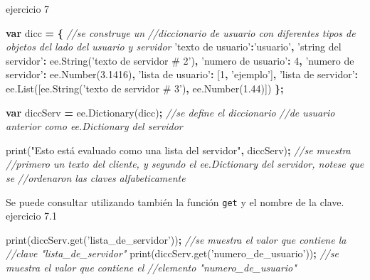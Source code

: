 \documentclass[
]{article}
\newenvironment{Shaded}{\begin{snugshade}}{\end{snugshade}}
\newcommand{\AttributeTok}[1]{\textcolor[rgb]{0.77,0.63,0.00}{#1}}
\newcommand{\CommentTok}[1]{\textcolor[rgb]{0.56,0.35,0.01}{\textit{#1}}}
\newcommand{\DecValTok}[1]{\textcolor[rgb]{0.00,0.00,0.81}{#1}}
\newcommand{\FloatTok}[1]{\textcolor[rgb]{0.00,0.00,0.81}{#1}}
\newcommand{\KeywordTok}[1]{\textcolor[rgb]{0.13,0.29,0.53}{\textbf{#1}}}
\newcommand{\NormalTok}[1]{#1}
\newcommand{\OperatorTok}[1]{\textcolor[rgb]{0.81,0.36,0.00}{\textbf{#1}}}
\newcommand{\StringTok}[1]{\textcolor[rgb]{0.31,0.60,0.02}{#1}}
\newcommand{\VariableTok}[1]{\textcolor[rgb]{0.00,0.00,0.00}{#1}}
\begin{document}
ejercicio 7

\begin{Shaded}
\begin{Highlighting}[]

\KeywordTok{var}\NormalTok{ dicc }\OperatorTok{=} \OperatorTok{\{}                                                  \CommentTok{//se construye un }
\CommentTok{//diccionario de usuario con diferentes tipos de objetos del lado del usuario y servidor}
  \StringTok{'texto de usuario'}\OperatorTok{:}\StringTok{'usuario'}\OperatorTok{,}
  \StringTok{'string del servidor'}\OperatorTok{:} \VariableTok{ee}\NormalTok{.}\AttributeTok{String}\NormalTok{(}\StringTok{'texto de servidor # 2'}\NormalTok{)}\OperatorTok{,}
  \StringTok{'numero de usuario'}\OperatorTok{:} \DecValTok{4}\OperatorTok{,}
  \StringTok{'numero de servidor'}\OperatorTok{:} \VariableTok{ee}\NormalTok{.}\AttributeTok{Number}\NormalTok{(}\FloatTok{3.1416}\NormalTok{)}\OperatorTok{,}
  \StringTok{'lista de usuario'}\OperatorTok{:}\NormalTok{ [}\DecValTok{1}\OperatorTok{,} \StringTok{'ejemplo'}\NormalTok{]}\OperatorTok{,}
  \StringTok{'lista de servidor'}\OperatorTok{:} \VariableTok{ee}\NormalTok{.}\AttributeTok{List}\NormalTok{([}\VariableTok{ee}\NormalTok{.}\AttributeTok{String}\NormalTok{(}\StringTok{'texto de servidor # 3'}\NormalTok{)}\OperatorTok{,} \VariableTok{ee}\NormalTok{.}\AttributeTok{Number}\NormalTok{(}\FloatTok{1.44}\NormalTok{)])}
\OperatorTok{\};} 

\KeywordTok{var}\NormalTok{ diccServ }\OperatorTok{=} \VariableTok{ee}\NormalTok{.}\AttributeTok{Dictionary}\NormalTok{(dicc)}\OperatorTok{;}                           \CommentTok{//se define el diccionario}
\CommentTok{//de usuario anterior como ee.Dictionary del servidor }

\AttributeTok{print}\NormalTok{(}\StringTok{"Esto está evaluado como una lista del servidor"}\OperatorTok{,}\NormalTok{ diccServ)}\OperatorTok{;}    \CommentTok{//se muestra }
\CommentTok{//primero un texto del cliente, y segundo el ee.Dictionary del servidor, notese que se }
\CommentTok{//ordenaron las claves alfabeticamente}
\end{Highlighting}
\end{Shaded}

Se puede consultar utilizando también la función \texttt{get} y el
nombre de la clave. ejercicio 7.1

\begin{Shaded}
\begin{Highlighting}[]
\AttributeTok{print}\NormalTok{(}\VariableTok{diccServ}\NormalTok{.}\AttributeTok{get}\NormalTok{(}\StringTok{'lista_de_servidor'}\NormalTok{))}\OperatorTok{;}        \CommentTok{//se muestra el valor que contiene la }
\CommentTok{//clave "lista_de_servidor"}
\AttributeTok{print}\NormalTok{(}\VariableTok{diccServ}\NormalTok{.}\AttributeTok{get}\NormalTok{(}\StringTok{'numero_de_usuario'}\NormalTok{))}\OperatorTok{;}        \CommentTok{//se muestra el valor que contiene el }
\CommentTok{//elemento "numero_de_usuario"}
\end{Highlighting}
\end{Shaded}
\end{document}
